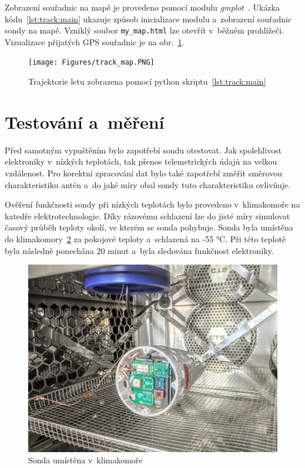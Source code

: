\documentclass[twoside]{ctuthesis}
\theoremstyle{plain}
\theoremstyle{definition}
\theoremstyle{note}
\begin{document}
	

	Zobrazení souřadnic na mapě je provedeno pomocí modulu \textit{gmplot}~\cite{gmplot_git}. Ukázka kódu~\ref{lst:track:main} ukazuje způsob inicializace modulu a~zobrazení souřadnic sondy na mapě. Vzniklý soubor \lstinline|my_map.html| lze otevřít v~běžném prohlížeči. Vizualizace přijatých GPS souřadnic je na obr.~\ref{fig:track:map}.

	

	\begin{figure}[hbtp]
		\centering
		\texttt{[image: Figures/track\_map.PNG]}
		\caption{Trajektorie letu zobrazena pomocí python skriptu~\ref{lst:track:main}}
		\label{fig:track:map}
	\end{figure}










	\section{Testování a~měření}
	Před samotným vypuštěním bylo zapotřebí sondu otestovat. Jak spolehlivost elektroniky v~nízkých teplotách, tak přenos telemetrických údajů na velkou vzdálenost. Pro korektní zpracování dat bylo také zapotřebí změřit směrovou charakteristiku antén a~do jaké míry obal sondy tuto charakteristiku ovlivňuje.

	Ověření funkčnosti sondy při nízkých teplotách bylo provedeno v~klimakomoře na katedře elektrotechnologie. Díky rázovému schlazení lze do jisté míry simulovat časový průběh teploty okolí, ve kterém se sonda pohybuje. Sonda byla umístěna do klimakomory~\ref{fig:sonda:klimakomora} za pokojové teploty a~schlazená na -55 °C. Při této teplotě byla následně ponechána 20 minut a~byla sledována funkčnost elektroniky.

	\begin{figure}[hbtp]
		\centering
		\includegraphics[width=.7\textwidth]{Figures/sonda_klimakomora.jpg}
		\caption{Sonda umístěna v~klimakomoře}
		\label{fig:sonda:klimakomora}
	\end{figure}
\end{document}

